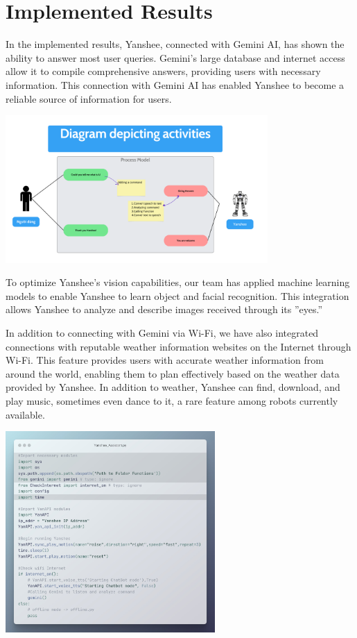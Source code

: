 \documentclass[12pt, a4paper]{article}
\begin{document}
\section{Implemented Results}
In the implemented results, Yanshee, connected with Gemini AI, has shown the ability to answer most user queries. Gemini's large database and internet access allow it to compile comprehensive answers, providing users with necessary information. This connection with Gemini AI has enabled Yanshee to become a reliable source of information for users.
\begin{center}
    \includegraphics[width = 10cm]{./image/7.png}
\end{center}

To optimize Yanshee's vision capabilities, our team has applied machine learning models to enable Yanshee to learn object and facial recognition. This integration allows Yanshee to analyze and describe images received through its ”eyes.”

In addition to connecting with Gemini via Wi-Fi, we have also integrated connections with reputable weather information websites on the Internet through Wi-Fi. This feature provides users with accurate weather information from around the world, enabling them to plan effectively based on the weather data provided by Yanshee. In addition to weather, Yanshee can find, download, and play music, sometimes even dance to it, a rare feature among robots currently available.
\begin{center}
    \includegraphics[width = 0.6\textwidth]{./image/6.png}
\end{center}
\end{document}
